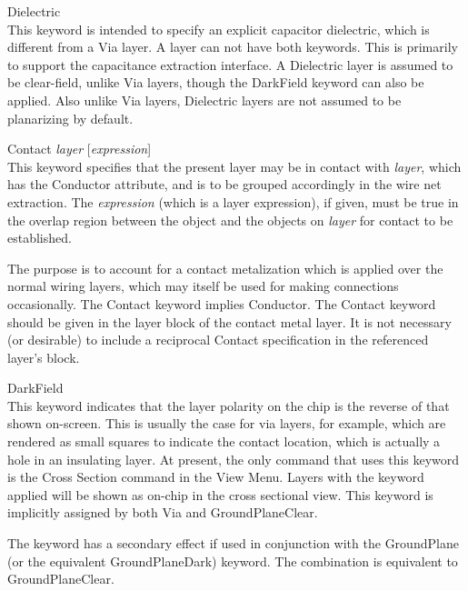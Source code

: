 \begin{description}
\item{\et Dielectric}\\
This keyword is intended to specify an explicit capacitor dielectric,
which is different from a {\vt Via} layer.  A layer can not have both
keywords.  This is primarily to support the capacitance extraction
interface.  A {\vt Dielectric} layer is assumed to be clear-field,
unlike {\vt Via} layers, though the {\vt DarkField} keyword can also
be applied.  Also unlike {\vt Via} layers, {\vt Dielectric} layers are
not assumed to be planarizing by default.

\item{\et Contact} {\it layer} [{\it expression\/}]\\
This keyword specifies that the present layer may be in contact with
{\it layer}, which has the {\et Conductor} attribute, and is to be
grouped accordingly in the wire net extraction.  The {\it expression}
(which is a layer expression), if given, must be true in the overlap
region between the object and the objects on {\it layer} for contact
to be established.

The purpose is to account for a contact metalization which is applied
over the normal wiring layers, which may itself be used for making
connections occasionally.  The {\et Contact} keyword implies {\et
Conductor}.  The {\et Contact} keyword should be given in the layer
block of the contact metal layer.  It is not necessary (or desirable)
to include a reciprocal {\et Contact} specification in the referenced
layer's block.

\item{\et DarkField}\\
This keyword indicates that the layer polarity on the chip is the
reverse of that shown on-screen.  This is usually the case for via
layers, for example, which are rendered as small squares to indicate
the contact location, which is actually a hole in an insulating layer. 
At present, the only command that uses this keyword is the {\cb Cross
Section} command in the {\cb View Menu}.  Layers with the keyword
applied will be shown as on-chip in the cross sectional view.
This keyword is implicitly assigned by both {\et Via} and
{\et GroundPlaneClear}.

The keyword has a secondary effect if used in conjunction with the
{\et GroundPlane} (or the equivalent {\et GroundPlaneDark}) keyword. 
The combination is equivalent to {\et GroundPlaneClear}.
\end{description}


